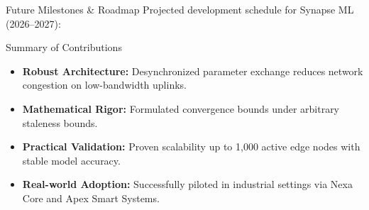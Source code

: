 \begin{frame}{Future Milestones \& Roadmap}
  Projected development schedule for Synapse ML (2026--2027):
  \vspace{0.8cm}
  \begin{center}
  \end{center}
\end{frame}

\begin{frame}{Summary of Contributions}
  \begin{itemize}
    \item<1-> \textbf{Robust Architecture:} Desynchronized parameter exchange reduces network congestion on low-bandwidth uplinks.
    \item<2-> \textbf{Mathematical Rigor:} Formulated convergence bounds under arbitrary staleness bounds.
    \item<3-> \textbf{Practical Validation:} Proven scalability up to 1,000 active edge nodes with stable model accuracy.
    \item<4-> \textbf{Real-world Adoption:} Successfully piloted in industrial settings via Nexa Core and Apex Smart Systems.
  \end{itemize}
\end{frame}

